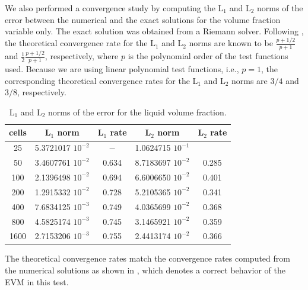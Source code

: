 \documentclass[preprint,10pt]{elsarticle}
\begin{document}
We also performed a convergence study by computing the L$_1$ and L$_2$ norms of the error between the numerical and the exact solutions for the volume 
fraction variable only. The exact solution was obtained from a Riemann solver. Following \cite{convergence_book}, the theoretical convergence rate for the L$_1$ and
L$_2$ norms are known to be $\frac{p+1/2}{p+1}$ and $\frac{1}{2}\frac{p+1/2}{p+1}$, respectively, where $p$ is the polynomial order of the test functions used. 
Because we are using linear polynomial test functions, i.e., $p=1$, the corresponding theoretical convergence rates for the L$_1$ and L$_2$ norms are 
$3/4$ and $3/8$, respectively. 
%
\begin{table}[H]
\begin{center}
 \caption{\label{tbl:conv_rate_norm} L$_1$ and L$_2$ norms of the error for the liquid volume fraction.}
 \begin{tabular}{|c|c|c|c|c|}
 \hline
cells  & L$_1$ norm  & L$_1$ rate   & L$_2$ norm & L$_2$ rate  \\ \hline
25     & 5.3721017 $10^{-2}$ & $-$    & 1.0624715 $10^{-1}$ & \\ \hline
50     & 3.4607761 $10^{-2}$ & 0.634 & 8.7183697 $10^{-2}$  & 0.285 \\ \hline
100   & 2.1396498 $10^{-2}$ & 0.694 & 6.6006650 $10^{-2}$  & 0.401 \\ \hline
200   & 1.2915332 $10^{-2}$ & 0.728 & 5.2105365 $10^{-2}$  & 0.341 \\ \hline
400   & 7.6834125 $10^{-3}$ & 0.749 & 4.0365699 $10^{-2}$  & 0.368 \\ \hline
800   & 4.5825174 $10^{-3}$ & 0.745 & 3.1465921 $10^{-2}$  & 0.359 \\ \hline
1600 & 2.7153206 $10^{-3}$ & 0.755 & 2.4413174 $10^{-2}$ & 0.366 \\ \hline
\end{tabular}
\end{center}
\end{table}
%
The theoretical convergence rates match the convergence rates computed from the numerical solutions as shown in , which denotes a  
correct behavior of the EVM in this test.

 
%
\end{document}
